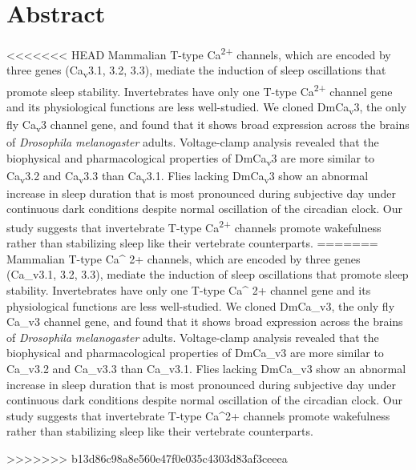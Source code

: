 \section*{Abstract}
<<<<<<< HEAD
Mammalian T-type Ca\textsuperscript{2+} channels, which are encoded by three genes (Ca\textsubscript{v}3.1, 3.2, 3.3), mediate the induction of sleep oscillations that promote sleep stability.
Invertebrates have only one T-type Ca\textsuperscript{2+} channel gene and its physiological functions are less well-studied.
We cloned DmCa\textsubscript{v}3, the only fly Ca\textsubscript{v}3 channel gene, and found that it shows broad expression across the brains of \emph{Drosophila melanogaster} adults.
Voltage-clamp analysis revealed that the biophysical and pharmacological properties of DmCa\textsubscript{v}3 are more similar to Ca\textsubscript{v}3.2 and Ca\textsubscript{v}3.3 than Ca\textsubscript{v}3.1.
Flies lacking DmCa\textsubscript{v}3 show an abnormal increase in sleep duration that is most pronounced during subjective day under continuous dark conditions despite normal oscillation of the circadian clock.
Our study suggests that invertebrate T-type Ca\textsuperscript{2+} channels promote wakefulness rather than stabilizing sleep like their vertebrate counterparts.
=======
Mammalian T-type Ca^ {2+} channels, which are encoded by three genes (Ca_{v}3.1, 3.2, 3.3), mediate the induction of sleep oscillations that promote sleep stability.
Invertebrates have only one T-type Ca^ {2+} channel gene and its physiological functions are less well-studied.
We cloned DmCa_{v}3, the only fly Ca_{v}3 channel gene, and found that it shows broad expression across the brains of \emph{Drosophila melanogaster} adults.
Voltage-clamp analysis revealed that the biophysical and pharmacological properties of DmCa_{v}3 are more similar to Ca_{v}3.2 and Ca_{v}3.3 than Ca_{v}3.1.
Flies lacking DmCa_{v}3 show an abnormal increase in sleep duration that is most pronounced during subjective day under continuous dark conditions despite normal oscillation of the circadian clock.
Our study suggests that invertebrate T-type Ca^{2+} channels promote wakefulness rather than stabilizing sleep like their vertebrate counterparts.
    
>>>>>>> b13d86c98a8e560e47f0e035c4303d83af3ceeea
